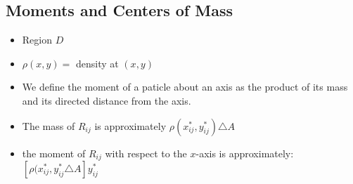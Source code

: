 \documentclass[12pt]{article}
\begin{document}
\subsection{Moments and Centers of Mass}
\begin{itemize}
	\item Region \(D\) 
	\item \(\rho (x,y) = \) density at \((x,y)\)
	\item We define the moment of a paticle about an axis as the product of its mass and its directed distance from the axis.
	\item The mass of \(R_{ij} \) is approximately \(\rho(x^{*}_{ij}, y^{*}_{ij}) \triangle A\)
	\item the moment of \(R_{ij}\) with respect to the \(x\)-axis is approximately:  \\
		\([\rho(x^{*}_{ij}, y^{*}_{ij}\triangle A] y^{*}_{ij}\)
\end{itemize}
\end{document}
